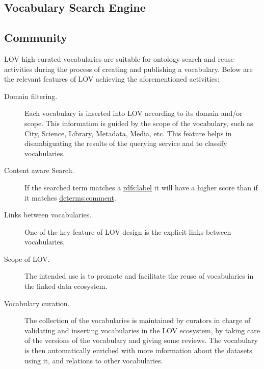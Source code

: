 \documentclass{iosart2c}
\begin{document}
	\subsection{Vocabulary Search Engine}
	\subsection{Community}

LOV high-curated vocabularies are suitable for ontology search and reuse activities during the process of creating and publishing a vocabulary. Below are the relevant features of LOV achieving the aforementioned activities:

 \begin{description}
	\item [Domain filtering.] Each vocabulary is inserted into LOV according to its domain and/or scope. This information is guided by the scope of the vocabulary, such as City, Science, Library, Metadata, Media, etc. This feature helps in disambiguating the results of the querying service and to classify vocabularies.
	\item [Content aware Search.] If the searched term matches a \url{rdfs:label} it will have a higher score than if it matches \url{dcterms:comment}.
	\item [Links between vocabularies.] One of the key feature of LOV design is the explicit links between vocabularies,
	 \item [Scope of LOV.]The intended use is to promote and facilitate the reuse of vocabularies in the linked data ecosystem.
	 \item [Vocabulary curation.]The collection of the vocabularies is maintained by curators in charge of validating and inserting vocabularies in the LOV ecosystem, by taking care of the versions of the vocabulary and giving some reviews. The vocabulary is then automatically enriched with more information about the datasets using it, and relations to other vocabularies.
 \end{description}

\end{document}
